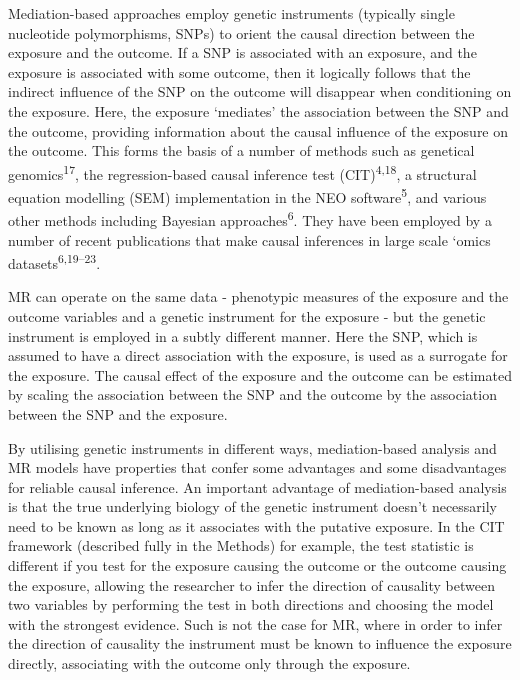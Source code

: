 \documentclass[]{article}
\begin{document}
Mediation-based approaches employ genetic instruments (typically single
nucleotide polymorphisms, SNPs) to orient the causal direction between
the exposure and the outcome. If a SNP is associated with an exposure,
and the exposure is associated with some outcome, then it logically
follows that the indirect influence of the SNP on the outcome will
disappear when conditioning on the exposure. Here, the exposure
`mediates' the association between the SNP and the outcome, providing
information about the causal influence of the exposure on the outcome.
This forms the basis of a number of methods such as genetical
genomics\textsuperscript{17}, the regression-based causal inference test
(CIT)\textsuperscript{4,18}, a structural equation modelling (SEM)
implementation in the NEO software\textsuperscript{5}, and various other
methods including Bayesian approaches\textsuperscript{6}. They have been
employed by a number of recent publications that make causal inferences
in large scale `omics datasets\textsuperscript{6,19--23}.

MR can operate on the same data - phenotypic measures of the exposure
and the outcome variables and a genetic instrument for the exposure -
but the genetic instrument is employed in a subtly different manner.
Here the SNP, which is assumed to have a direct association with the
exposure, is used as a surrogate for the exposure. The causal effect of
the exposure and the outcome can be estimated by scaling the association
between the SNP and the outcome by the association between the SNP and
the exposure.

By utilising genetic instruments in different ways, mediation-based
analysis and MR models have properties that confer some advantages and
some disadvantages for reliable causal inference. An important advantage
of mediation-based analysis is that the true underlying biology of the
genetic instrument doesn't necessarily need to be known as long as it
associates with the putative exposure. In the CIT framework (described
fully in the Methods) for example, the test statistic is different if
you test for the exposure causing the outcome or the outcome causing the
exposure, allowing the researcher to infer the direction of causality
between two variables by performing the test in both directions and
choosing the model with the strongest evidence. Such is not the case for
MR, where in order to infer the direction of causality the instrument
must be known to influence the exposure directly, associating with the
outcome only through the exposure.
\end{document}
